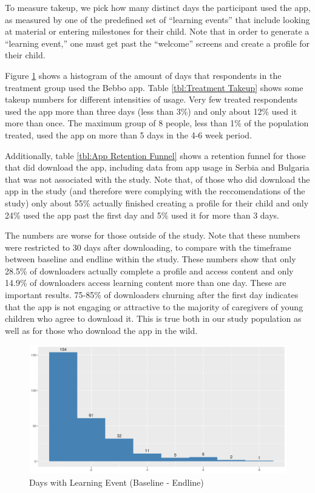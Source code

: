 \documentclass{article}
\begin{document}
To measure takeup, we pick how many distinct days the participant used the app, as measured by one of the predefined set of ``learning events'' that include looking at material or entering milestones for their child. Note that in order to generate a ``learning event,'' one must get past the ``welcome'' screens and create a profile for their child.

Figure \ref{fig:treatment-takeup-histogram} shows a histogram of the amount of days that respondents in the treatment group used the Bebbo app. Table \ref{tbl:Treatment Takeup} shows some takeup numbers for different intensities of usage. Very few treated respondents used the app more than three days (less than 3\%) and only about 12\% used it more than once. The maximum group of 8 people, less than 1\% of the population treated, used the app on more than 5 days in the 4-6 week period.

Additionally, table \ref{tbl:App Retention Funnel} shows a retention funnel for those that did download the app, including data from app usage in Serbia and Bulgaria that was not associated with the study. Note that, of those who did download the app in the study (and therefore were complying with the reccomendations of the study) only about 55\% actually finished creating a profile for their child and only 24\% used the app past the first day and 5\% used it for more than 3 days.

The numbers are worse for those outside of the study. Note that these numbers were restricted to 30 days after downloading, to compare with the timeframe between baseline and endline within the study. These numbers show that only 28.5\% of downloaders actually complete a profile and access content and only 14.9\% of downloaders access learning content more than one day. These are important results. 75-85\% of downloaders churning after the first day indicates that the app is not engaging or attractive to the majority of caregivers of young children who agree to download it. This is true both in our study population as well as for those who download the app in the wild.


\begin{figure}[H]
  \centering
\includegraphics[width=\textwidth]{plots/Treatment Takeup Baseline - Endline.png}
\caption{Days with Learning Event (Baseline - Endline)}
\label{fig:treatment-takeup-histogram}
\end{figure}
\end{document}
